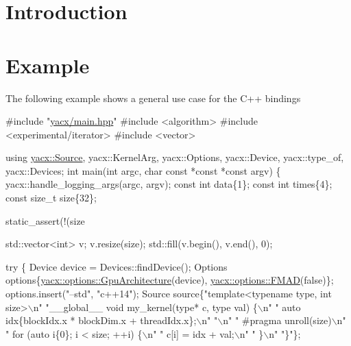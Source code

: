 \hypertarget{index_intro}{}\section{Introduction}\label{index_intro}
\hypertarget{index_example}{}\section{Example}\label{index_example}
The following example shows a general use case for the C++ bindings


\begin{DoxyCodeInclude}
\textcolor{preprocessor}{#include "\hyperlink{main_8hpp}{yacx/main.hpp}"}
\textcolor{preprocessor}{#include <algorithm>}
\textcolor{preprocessor}{#include <experimental/iterator>}
\textcolor{preprocessor}{#include <vector>}

\textcolor{keyword}{using} \hyperlink{classyacx_1_1_source}{yacx::Source}, yacx::KernelArg, yacx::Options, yacx::Device, yacx::type\_of,
    yacx::Devices;
\textcolor{keywordtype}{int} main(\textcolor{keywordtype}{int} argc, \textcolor{keywordtype}{char} \textcolor{keyword}{const} *\textcolor{keyword}{const} *\textcolor{keyword}{const} argv) \{
  yacx::handle\_logging\_args(argc, argv);
  \textcolor{keyword}{const} \textcolor{keywordtype}{int} data\{1\};
  \textcolor{keyword}{const} \textcolor{keywordtype}{int} times\{4\};
  \textcolor{keyword}{const} \textcolor{keywordtype}{size\_t} size\{32\};

  static\_assert(!(size %

  std::vector<int> v;
  v.resize(size);
  std::fill(v.begin(), v.end(), 0);

  \textcolor{keywordflow}{try} \{
    Device device = Devices::findDevice();
    Options options\{\hyperlink{classyacx_1_1options_1_1_gpu_architecture}{yacx::options::GpuArchitecture}(device),
                    \hyperlink{classyacx_1_1options_1_1_f_m_a_d}{yacx::options::FMAD}(\textcolor{keyword}{false})\};
    options.insert(\textcolor{stringliteral}{"--std"}, \textcolor{stringliteral}{"c++14"});
    Source source\{\textcolor{stringliteral}{"template<typename type, int size>\(\backslash\)n"}
                  \textcolor{stringliteral}{"\_\_global\_\_ void my\_kernel(type* c, type val) \{\(\backslash\)n"}
                  \textcolor{stringliteral}{"    auto idx\{blockIdx.x * blockDim.x + threadIdx.x\};\(\backslash\)n"}
                  \textcolor{stringliteral}{"\(\backslash\)n"}
                  \textcolor{stringliteral}{"    #pragma unroll(size)\(\backslash\)n"}
                  \textcolor{stringliteral}{"    for (auto i\{0\}; i < size; ++i) \{\(\backslash\)n"}
                  \textcolor{stringliteral}{"        c[i] = idx + val;\(\backslash\)n"}
                  \textcolor{stringliteral}{"    \}\(\backslash\)n"}
                  \textcolor{stringliteral}{"\}"}\};


\end{DoxyCodeInclude}
